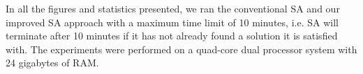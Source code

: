 In all the figures and statistics presented, we ran the conventional SA and our
improved SA approach with a maximum time limit of 10 minutes, i.e. SA will
terminate after 10 minutes if it has not already found a solution it is
satisfied with. The experiments were performed on a quad-core dual processor
system with 24 gigabytes of RAM.

\begin{figure}[t!]
  \centering

\end{figure}
